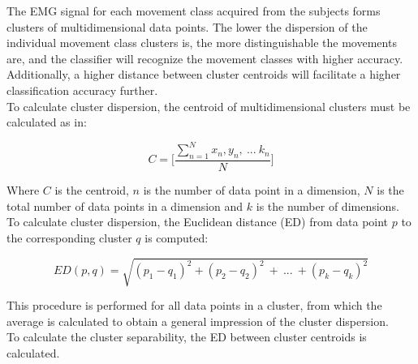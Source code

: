 The EMG signal for each movement class acquired from the subjects forms clusters of multidimensional data points. The lower the dispersion of the individual movement class clusters is, the more distinguishable the movements are, and the classifier will recognize the movement classes with higher accuracy. Additionally, a higher distance between cluster centroids will facilitate a higher classification accuracy further. \\%
To calculate cluster dispersion, the centroid of multidimensional clusters must be calculated as in:

 \begin{equation} \label{eq:centroid}
C = \Bigg[ \frac{\sum\limits_{n=1}^{N}x_{n},y_{n},~...~k_{n}}{N} \Bigg]
\end{equation}

Where $C$ is the centroid, $n$ is the number of data point in a dimension, $N$ is the total number of data points in a dimension and $k$ is the number of dimensions. To calculate cluster dispersion, the Euclidean distance (ED) from data point $p$ to the corresponding cluster $q$ is computed: %

\begin{equation} \label{eq:euclidiandistance}
ED(p,q) = \sqrt{(p_1-q_1)^2 + (p_2-q_2)^2~+~...~+ (p_k-q_k)^2}
\end{equation} 

This procedure is performed for all data points in a cluster, from which the average is calculated to obtain a general impression of the cluster dispersion.\\
To calculate the cluster separability, the ED between cluster centroids is calculated.  

